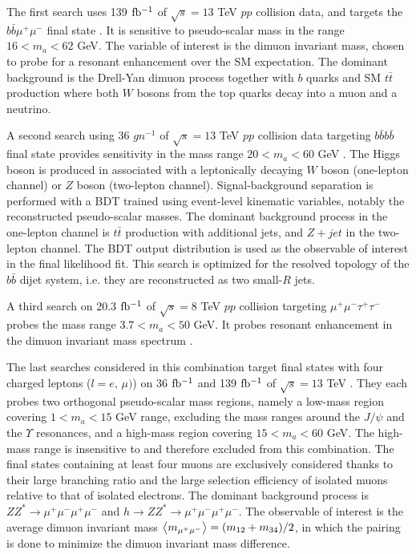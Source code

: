 The first search uses 139 $\mbox{fb\(^{-1}\)}$ of $\sqrt{s}=13$ TeV $pp$ collision data, and targets the $b\bar{b}\mu^+\mu^-$ final state \cite{HDBS-2021-03}. It is sensitive to pseudo-scalar mass in the range $16<m_a<62$ GeV. The variable of interest is the dimuon invariant mass, chosen to probe for a resonant enhancement over the SM expectation. The dominant background is the Drell-Yan dimuon process together with $b$ quarks and SM $t\bar{t}$ production where both $W$ bosons from the top quarks decay into a muon and a neutrino. 

A second search using 36 $gn^{-1}$ of $\sqrt{s}=13$ TeV $pp$ collision data targeting $b\bar{b}b\bar{b}$ final state provides sensitivity in the mass range $20<m_a<60$ GeV \cite{HIGG-2017-05}. The Higgs boson is produced in associated with a leptonically decaying $W$ boson (one-lepton channel) or $Z$ boson (two-lepton channel). Signal-background separation is performed with a BDT trained using event-level kinematic variables, notably the reconstructed pseudo-scalar masses. The dominant background process in the one-lepton channel is $t\bar{t}$ production with additional jets, and $Z+jet$ in the two-lepton channel. The BDT output distribution is used as the observable of interest in the final likelihood fit. This search is optimized for the resolved topology of the $b\bar{b}$ dijet system, i.e. they are reconstructed as two small-$R$ jets. 

A third search on 20.3 $\mbox{fb\(^{-1}\)}$ of $\sqrt{s}=8$ TeV $pp$ collision targeting $\mu^+\mu^-\tau^+\tau^-$ probes the mass range $3.7<m_a<50$ GeV. It probes resonant enhancement in the dimuon invariant mass spectrum \cite{HIGG-2014-02}.

The last searches considered in this combination target final states with four charged leptons ($l=e,\,\mu)$) on 36 $\mbox{fb\(^{-1}\)}$ and 139 $\mbox{fb\(^{-1}\)}$ of $\sqrt{s}=13$ TeV \cite{EXOT-2016-22, HDBS-2018-55}. They each probes two orthogonal pseudo-scalar mass regions, namely a low-mass region covering $1<m_a<15$ GeV range, excluding the mass ranges around the $J/\psi$ and the $\Upsilon$ resonances, and a high-mass region covering $15<m_a<60$ GeV. The high-mass range is insensitive to \thdma and therefore excluded from this combination. The final states containing at least four muons are exclusively considered thanks to their large branching ratio and the large selection efficiency of isolated muons relative to that of isolated electrons. The dominant background process is $ZZ^*\rightarrow \mu^+\mu^-\mu^+\mu^-$ and $h\rightarrow ZZ^*\rightarrow \mu^+\mu^-\mu^+\mu^-$. The observable of interest is the average dimuon invariant mass $\expval{m_{\mu^+\mu^-}} = (m_{12} + m_{34})/2$, in which the pairing is done to minimize the dimuon invariant mass difference. 

